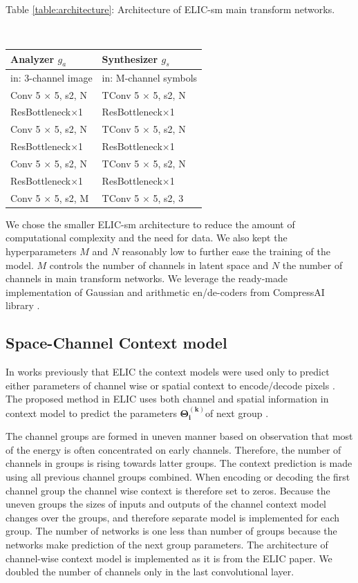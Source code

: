 \documentclass{article}
\begin{document}
\begin{center}
\caption{Table \ref{table:architecture}: Architecture of ELIC-sm main transform networks. \cite{ELIC}}\\
\begin{tabular}{l|l}
\hline
Analyzer $g_a$ & Synthesizer $g_s$ \\
\hline
in: 3-channel image & in: M-channel symbols \\
\hline
Conv 5 $\times$ 5, s2, N & TConv 5 $\times$ 5, s2, N \\
ResBottleneck$\times$1 & ResBottleneck$\times$1 \\
Conv 5 $\times$ 5, s2, N & TConv 5 $\times$ 5, s2, N \\
ResBottleneck$\times$1 & ResBottleneck$\times$1 \\
Conv 5 $\times$ 5, s2, N & TConv 5 $\times$ 5, s2, N \\
ResBottleneck$\times$1 & ResBottleneck$\times$1 \\
Conv 5 $\times$ 5, s2, M & TConv 5 $\times$ 5, s2, 3 \\
\hline
\end{tabular}
\label{table:architecture}
\end{center}

We chose the smaller ELIC-sm architecture to reduce the amount of computational complexity and the need for data. We also kept the hyperparameters $M$ and $N$ reasonably low to further ease the training of the model. $M$ controls the number of channels in latent space and $N$ the number of channels in main transform networks. We leverage the ready-made implementation of Gaussian and arithmetic en/de-coders from CompressAI library \cite{compressai}. 

\subsection{Space-Channel Context model}
In works previously that ELIC \cite{ELIC} the context models were used only to predict either parameters of channel wise or spatial context to encode/decode pixels \cite{balle2016, mbt2018, balle2018, checkerboard}. The proposed method in ELIC uses both channel and spatial information in context model to predict the parameters $\mathbf{\Theta_i^{(k)}}$of next group \cite{ELIC}. 

The channel groups are formed in uneven manner based on observation that most of the energy is often concentrated on early channels. Therefore, the number of channels in groups is rising towards latter groups. The context prediction is made using all previous channel groups combined. When encoding or decoding the first channel group the channel wise context is therefore set to zeros. Because the uneven groups the sizes of inputs and outputs of the channel context model changes over the groups, and therefore separate model is implemented for each group. The number of networks is one less than number of groups because the networks make prediction of the next group parameters. The architecture of channel-wise context model is implemented as it is from the ELIC paper. \cite{ELIC} We doubled the number of channels only in the last convolutional layer.
\end{document}
